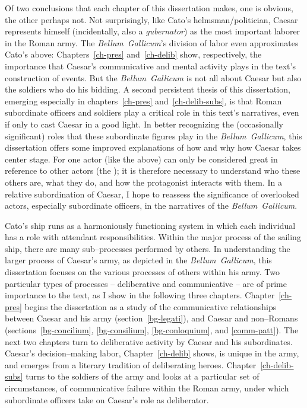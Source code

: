 \documentclass[12pt,letterpaper,oneside,final]{memoir}
\begin{document}
Of two conclusions that each chapter of this dissertation makes, one is obvious, the other perhaps not. Not surprisingly, like Cato's helmsman/politician, Caesar represents himself (incidentally, also a \emph{gubernator}) as the most important laborer in the Roman army. The \emph{Bellum~Gallicum}'s division of labor even approximates Cato's above: Chapters~\ref{ch-pres} and~\ref{ch-delib} show, respectively, the importance that Caesar's communicative and mental activity plays in the text's construction of events. But the \emph{Bellum~Gallicum} is not all about Caesar but also the soldiers who do his bidding. A second persistent thesis of this dissertation, emerging especially in chapters~\ref{ch-pres} and~\ref{ch-delib-subs}, is that Roman subordinate officers and soldiers play a critical role in this text's narratives, even if only to cast Caesar in a good light. In better recognizing the (occasionally significant) roles that these subordinate figures play in the \emph{Bellum~Gallicum}, this dissertation offers some improved explanations of how and why how Caesar takes center stage. For one actor (like the  above) can only be considered great in reference to other actors (the ); it is therefore necessary to understand who these others are, what they do, and how the protagonist interacts with them. In a relative subordination of Caesar, I hope to reassess the significance of overlooked actors, especially subordinate officers, in the narratives of the \emph{Bellum~Gallicum}.

Cato's ship runs as a harmoniously functioning system in which each individual has a role with attendant responsibilities. Within the major process of the sailing ship, there are many sub--processes performed by others. In understanding the larger process of Caesar's army, as depicted in the \emph{Bellum~Gallicum}, this dissertation focuses on the various processes of others within his army. Two particular types of processes -- deliberative and communicative -- are of prime importance to the text, as I show in the following three chapters. Chapter~\ref{ch-pres} begins the dissertation as a study of the communicative relationships between Caesar and his army (section~\ref{bg-legati}), and Caesar and non--Romans (sections~\ref{bg-concilium}, \ref{bg-consilium}, \ref{bg-conloquium}, and \ref{comm-patt}). The next two chapters turn to deliberative activity by Caesar and his subordinates. Caesar's decision--making labor, Chapter~\ref{ch-delib} shows, is unique in the army, and emerges from a literary tradition of deliberating heroes. Chapter~\ref{ch-delib-subs} turns to the soldiers of the army and looks at a particular set of circumstances, of communicative failure within the Roman army, under which subordinate officers take on Caesar's role as deliberator.
\end{document}
